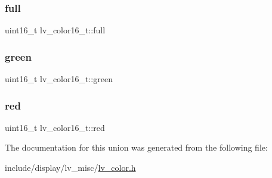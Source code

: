 \mbox{\label{unionlv__color16__t_a1ca6c661db8e7551e95792af824f6403}} 
\subsubsection{\texorpdfstring{full}{full}}
{\footnotesize\ttfamily uint16\+\_\+t lv\+\_\+color16\+\_\+t\+::full}

\mbox{\label{unionlv__color16__t_a229d888dcd846712eb78010a4938d39d}} 
\subsubsection{\texorpdfstring{green}{green}}
{\footnotesize\ttfamily uint16\+\_\+t lv\+\_\+color16\+\_\+t\+::green}

\mbox{\label{unionlv__color16__t_a0040e16563df0dd2d1f052e8cac9a980}} 
\subsubsection{\texorpdfstring{red}{red}}
{\footnotesize\ttfamily uint16\+\_\+t lv\+\_\+color16\+\_\+t\+::red}



The documentation for this union was generated from the following file\+:\begin{DoxyCompactItemize}
\item 
include/display/lv\+\_\+misc/\mbox{\hyperlink{lv__color_8h}{lv\+\_\+color.\+h}}\end{DoxyCompactItemize}
